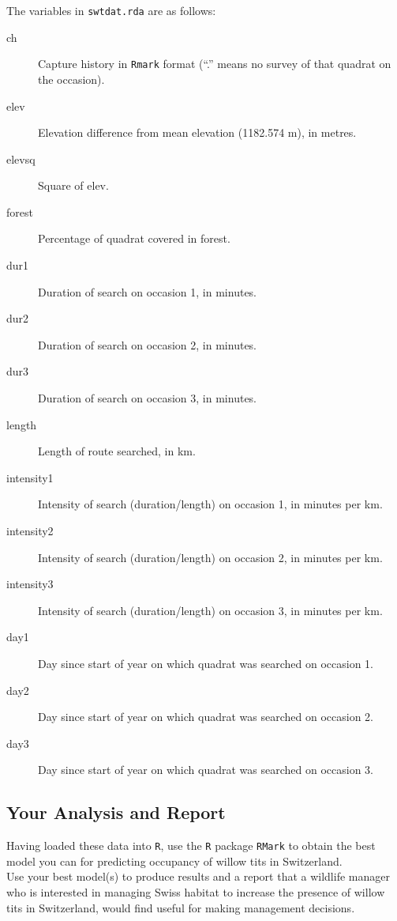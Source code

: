 The variables in \verb|swtdat.rda| are as follows:

\begin{description}
\item[ch] Capture history in \verb|Rmark| format (``.'' means no survey of that quadrat on the occasion).
\item[elev] Elevation difference from mean elevation (1182.574 m), in metres.
\item[elevsq] Square of elev.
\item[forest] Percentage of quadrat covered in forest.
\item[dur1] Duration of search on occasion 1, in minutes.
\item[dur2] Duration of search on occasion 2, in minutes.
\item[dur3] Duration of search on occasion 3, in minutes.
\item[length] Length of route searched, in km.
\item[intensity1] Intensity of search (duration/length) on occasion 1, in minutes per km.
\item[intensity2] Intensity of search (duration/length) on occasion 2, in minutes per km.
\item[intensity3] Intensity of search (duration/length) on occasion 3, in minutes per km.
\item[day1] Day since start of year on which quadrat was searched on occasion 1.
\item[day2] Day since start of year on which quadrat was searched on occasion 2.
\item[day3] Day since start of year on which quadrat was searched on occasion 3.
\end{description}



\subsection*{Your Analysis and Report}

Having loaded these data into \verb|R|, use the \verb|R| package \verb|RMark| to obtain the best model you can for predicting occupancy of willow tits in Switzerland. \\

Use your best model(s) to produce results and a report that a wildlife manager who is interested in managing Swiss habitat to increase the presence of willow tits in Switzerland, would find useful for making management decisions. \\


